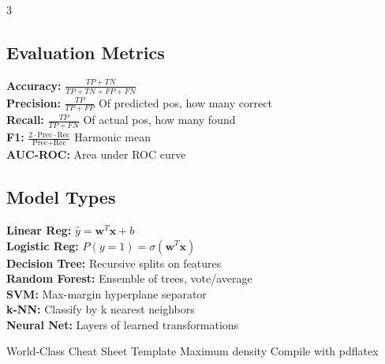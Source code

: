 \documentclass[7pt,landscape]{extarticle}
\begin{document}
\begin{multicols*}{3}
\subsection*{Evaluation Metrics}
\textbf{Accuracy:} $\frac{TP+TN}{TP+TN+FP+FN}$ \\
\textbf{Precision:} $\frac{TP}{TP+FP}$ \hfill Of predicted pos, how many correct \\
\textbf{Recall:} $\frac{TP}{TP+FN}$ \hfill Of actual pos, how many found \\
\textbf{F1:} $\frac{2 \cdot \text{Prec} \cdot \text{Rec}}{\text{Prec} + \text{Rec}}$ \hfill Harmonic mean \\
\textbf{AUC-ROC:} Area under ROC curve

\subsection*{Model Types}
\textbf{Linear Reg:} $\hat{y} = \mathbf{w}^T\mathbf{x} + b$ \\
\textbf{Logistic Reg:} $P(y=1) = \sigma(\mathbf{w}^T\mathbf{x})$ \\
\textbf{Decision Tree:} Recursive splits on features \\
\textbf{Random Forest:} Ensemble of trees, vote/average \\
\textbf{SVM:} Max-margin hyperplane separator \\
\textbf{k-NN:} Classify by k nearest neighbors \\
\textbf{Neural Net:} Layers of learned transformations


\vfill
\begin{center}
{\fontsize{5pt}{6pt}\selectfont\textcolor{csGray}{%
World-Class Cheat Sheet Template \textbar{} Maximum density \textbar{} Compile with pdflatex%
}}
\end{center}

\end{multicols*}
\end{document}
